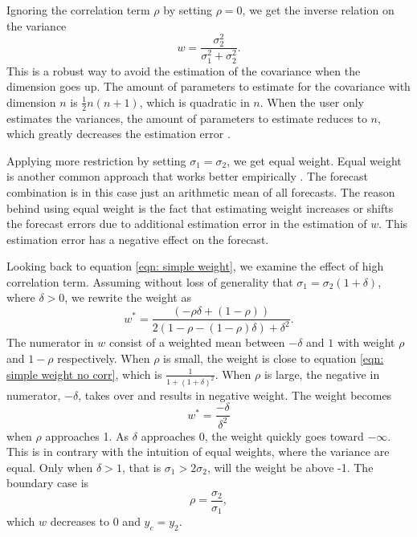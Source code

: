 \documentclass[11pt]{article}
\begin{document}
Ignoring the correlation term \(\rho\) by setting \(\rho=0\), we get the
inverse relation on the variance
\begin{equation}
\label{eqn: simple weight no corr}
w=\frac{\sigma_2^2}{\sigma_1^2+\sigma_2^2}.
\end{equation}
This is a robust way to avoid the estimation of the covariance when the
dimension goes up. The amount of parameters to estimate for the
covariance with dimension \(n\) is \(\frac{1}{2}n(n+1)\), which is
quadratic in \(n\). When the user only estimates the variances, the
amount of parameters to estimate reduces to \(n\), which greatly
decreases the estimation error \citep{Stock2001}.

Applying more restriction by setting $\sigma_1=\sigma_2$, we get equal weight. Equal weight is another common approach that works better empirically \citep{Clemen1989}. The forecast combination is in this case just an
arithmetic mean of all forecasts. The reason behind using equal weight is the fact
that estimating weight increases or shifts the forecast errors due to
additional estimation error in the estimation of \(w\). This estimation error has a negative effect on the forecast.

Looking back to equation \ref{eqn: simple weight}, we examine the effect
of high correlation term. Assuming without loss of generality that
\(\sigma_1 =\sigma_2 (1 + \delta)\), where \(\delta>0\), we rewrite the
weight as
\begin{equation}
\label{eqn: w high corr}
w^* = \frac{(-\rho\delta+ (1-\rho))}{2(1-\rho - (1-\rho)\delta)+\delta^2}.
\end{equation}
The numerator in \(w\) consist of a weighted
mean between $-\delta$ and $1$ with weight \(\rho\) and $1-\rho$ respectively. When \(\rho\)
is small, the weight is close to equation
\ref{eqn: simple weight no corr}, which is $\frac{1}{1+(1+\delta)^2}$. When \(\rho\) is large, the negative in numerator, \(-\delta\), takes over and results in negative
weight. The weight becomes 
\begin{equation}
\label{eqn: w simple rho 1}
w^* = \frac{-\delta}{\delta^2}
\end{equation}
when $\rho$ approaches 1. As $\delta$ approaches 0, the weight quickly goes toward $-\infty$. This is in contrary with the intuition of equal weights, where the variance are equal.
Only when $\delta >1$, that is $\sigma_1 > 2\sigma_2$, will the weight be above -1.
The boundary case is
\begin{equation}
\label{eqn: corr boundary}
\rho = \frac{\sigma_2}{\sigma_1},
\end{equation}
which \(w\) decreases to \(0\) and \(y_c = y_2\).
\end{document}
